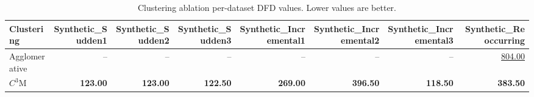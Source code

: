 \begin{table}
\caption{Clustering ablation per-dataset DFD values. Lower values are better.}
\label{tab:per-data-clustering-ablation-delay-for-detection}
\begin{tabular}{lrrrrrrr}
\toprule
Clustering & Synthetic\_Sudden1 & Synthetic\_Sudden2 & Synthetic\_Sudden3 & Synthetic\_Incremental1 & Synthetic\_Incremental2 & Synthetic\_Incremental3 & Synthetic\_Reoccurring \\
\midrule
Agglomerative & -- & -- & -- & -- & -- & -- & \underline{804.00} \\
$C^3$M & \textbf{123.00} & \textbf{123.00} & \textbf{122.50} & \textbf{269.00} & \textbf{396.50} & \textbf{118.50} & \textbf{383.50} \\
\bottomrule
\end{tabular}
\end{table}

